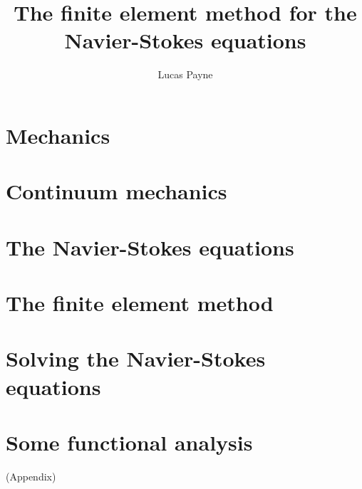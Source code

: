 \documentclass[11pt,a4paper]{memoir}
\begin{document}
\title{\Huge \textbf{The finite element method for the Navier-Stokes equations}}
\author{Lucas Payne}

\maketitle

\tableofcontents

\chapter{Mechanics}


\chapter{Continuum mechanics}


\chapter{The Navier-Stokes equations}


\chapter{The finite element method}


\chapter{Solving the Navier-Stokes equations}

\chapter{Some functional analysis}
(Appendix)
\end{document}
